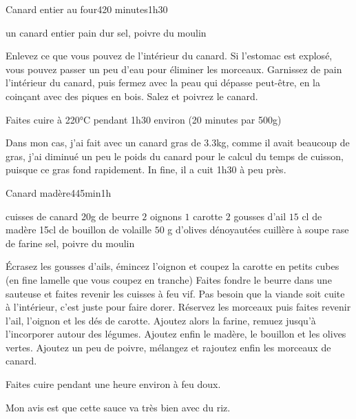 \begin{recette}{Canard entier au four}{4}{20 minutes}{1h30}
\begin{ingredients}
\ingredient un canard entier
\ingredient pain dur
\ingredient sel, poivre du moulin
\end{ingredients}

\begin{preparation}
\etape Enlevez ce que vous pouvez de l'intérieur du canard. Si l'estomac est explosé, vous pouvez passer un peu d'eau pour éliminer les morceaux.
\etape Garnissez de pain l'intérieur du canard, puis fermez avec la peau qui dépasse peut-être, en la coinçant avec des piques en bois.
\etape Salez et poivrez le canard.
\end{preparation}

\begin{cuisson}
Faites cuire à 220°C pendant 1h30 environ (20 minutes par 500g)

Dans mon cas, j'ai fait avec un canard gras de 3.3kg, comme il avait beaucoup de gras, j'ai diminué un peu le poids du canard pour le calcul du temps de cuisson, puisque ce gras fond rapidement. In fine, il a cuit 1h30 à peu près.
\end{cuisson}
\end{recette}

\begin{recette}{Canard madère}{4}{45min}{1h}

\begin{ingredients}
 cuisses de canard
\ingredient 20g de beurre
\ingredient $2$ oignons
\ingredient $1$ carotte
\ingredient $2$ gousses d'ail
\ingredient $15$ cl de madère
\ingredient 15cl de bouillon de volaille
\ingredient $50$ g d'olives dénoyautées
 cuillère à soupe rase de farine
\ingredient sel, poivre du moulin
\end{ingredients}

\begin{preparation}
\etape Écrasez les gousses d'ails, émincez l'oignon et coupez la carotte en petits cubes (en fine lamelle que vous coupez en tranche)
\etape Faites fondre le beurre dans une sauteuse et faites revenir les cuisses à feu vif. Pas besoin que la viande soit cuite à l'intérieur, c'est juste pour faire dorer.
\etape Réservez les morceaux puis faites revenir l'ail, l'oignon et les dés de carotte.
\etape Ajoutez alors la farine, remuez jusqu'à l'incorporer autour des légumes. Ajoutez enfin le madère, le bouillon et les olives vertes. Ajoutez un peu de poivre, mélangez et rajoutez enfin les morceaux de canard.
\end{preparation}

\begin{cuisson}
Faites cuire pendant une heure environ à feu doux.
\end{cuisson}


\begin{remarque}
Mon avis est que cette sauce va très bien avec du riz.
\end{remarque}

\end{recette}

